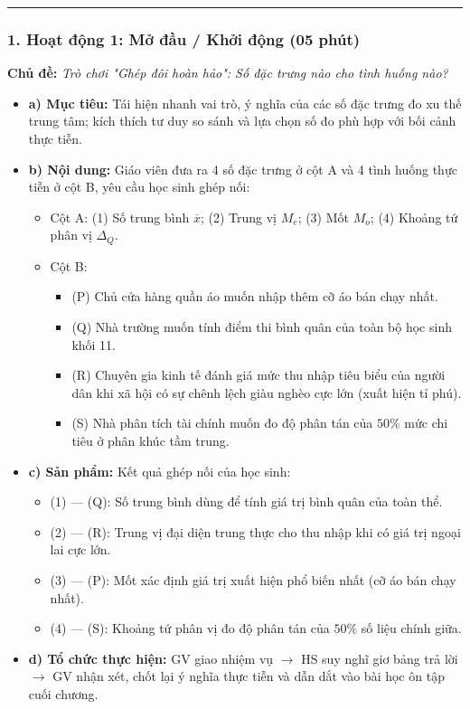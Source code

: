 \documentclass[12pt, a4paper]{article}
\begin{document}
\vspace{0.8em}
\hrule
\vspace{0.8em}

\subsubsection*{1. Hoạt động 1: Mở đầu / Khởi động (05 phút)}
\textbf{Chủ đề:} \textit{Trò chơi "Ghép đôi hoàn hảo": Số đặc trưng nào cho tình huống nào?}
\begin{itemize}
    \item \textbf{a) Mục tiêu:} Tái hiện nhanh vai trò, ý nghĩa của các số đặc trưng đo xu thế trung tâm; kích thích tư duy so sánh và lựa chọn số đo phù hợp với bối cảnh thực tiễn.
    \item \textbf{b) Nội dung:} Giáo viên đưa ra 4 số đặc trưng ở cột A và 4 tình huống thực tiễn ở cột B, yêu cầu học sinh ghép nối:
    \begin{itemize}
        \item Cột A: (1) Số trung bình $\overline{x}$; (2) Trung vị $M_e$; (3) Mốt $M_o$; (4) Khoảng tứ phân vị $\Delta_Q$.
        \item Cột B:
        \begin{itemize}
            \item (P) Chủ cửa hàng quần áo muốn nhập thêm cỡ áo bán chạy nhất.
            \item (Q) Nhà trường muốn tính điểm thi bình quân của toàn bộ học sinh khối 11.
            \item (R) Chuyên gia kinh tế đánh giá mức thu nhập tiêu biểu của người dân khi xã hội có sự chênh lệch giàu nghèo cực lớn (xuất hiện tỉ phú).
            \item (S) Nhà phân tích tài chính muốn đo độ phân tán của $50\%$ mức chi tiêu ở phân khúc tầm trung.
        \end{itemize}
    \end{itemize}
    \item \textbf{c) Sản phẩm:} Kết quả ghép nối của học sinh:
    \begin{itemize}
        \item (1) --- (Q): Số trung bình dùng để tính giá trị bình quân của toàn thể.
        \item (2) --- (R): Trung vị đại diện trung thực cho thu nhập khi có giá trị ngoại lai cực lớn.
        \item (3) --- (P): Mốt xác định giá trị xuất hiện phổ biến nhất (cỡ áo bán chạy nhất).
        \item (4) --- (S): Khoảng tứ phân vị đo độ phân tán của $50\%$ số liệu chính giữa.
    \end{itemize}
    \item \textbf{d) Tổ chức thực hiện:} GV giao nhiệm vụ $\to$ HS suy nghĩ giơ bảng trả lời $\to$ GV nhận xét, chốt lại ý nghĩa thực tiễn và dẫn dắt vào bài học ôn tập cuối chương.
\end{itemize}
\end{document}
